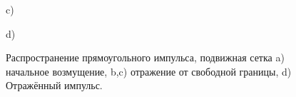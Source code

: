 \begin{figure}
\begin{minipage}[h]{0.47\linewidth}
\end{minipage}
\vfill
\begin{minipage}[h]{0.47\linewidth}
 c) \\
\end{minipage}
\hfill
\begin{minipage}[h]{0.47\linewidth}
 d) \\
\end{minipage}
\caption{Распространение прямоугольного импульса, подвижная сетка a) начальное возмущение, b,c) отражение от свободной границы, d) Отражённый импульс.}
\label{pic:el-mv}
\end{figure}

